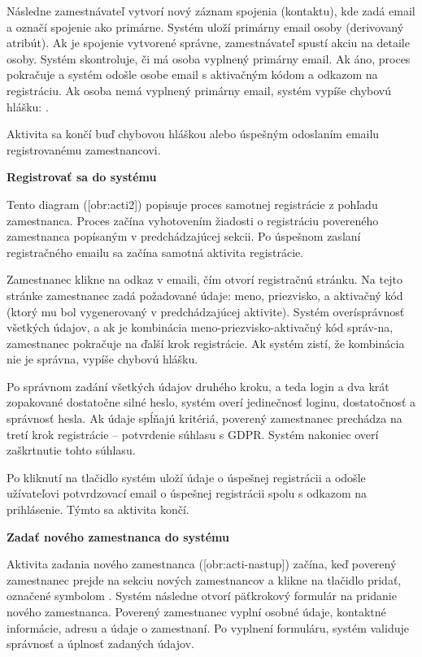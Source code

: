 Následne zamestnávateľ vytvorí nový záznam spojenia (kontaktu), kde zadá email a označí spojenie ako primárne. Systém uloží primárny email osoby (derivovaný atribút). Ak je spojenie vytvorené správne, zamestnávateľ spustí akciu  na detaile osoby. Systém skontroluje, či má osoba vyplnený primárny email. Ak áno, proces pokračuje a systém odošle osobe email s aktivačným kódom a odkazom na registráciu. Ak osoba nemá vyplnený primárny email, systém vypíše chybovú hlášku: .

Aktivita sa končí buď chybovou hláškou alebo úspešným odoslaním emailu registrovanému zamestnancovi.

\blank
\start
\setupindenting[no]
\start\bf Registrovať sa do systému\stop
\stop


Tento diagram ([obr:acti2]) popisuje proces samotnej registrácie z pohľadu zamestnanca. Proces začína vyhotovením žiadosti o registráciu povereného zamestnanca popísaným v predchádzajúcej sekcii. Po úspešnom zaslaní registračného emailu sa začína samotná aktivita registrácie.

Zamestnanec klikne na odkaz v emaili, čím otvorí registračnú stránku. Na tejto stránke zamestnanec zadá požadované údaje: meno, priezvisko, a aktivač\-ný kód (ktorý mu bol vygenerovaný v predchádzajúcej aktivite). Systém overí\zlom správnosť všetkých údajov, a ak je kombinácia meno-priezvisko-aktivačný kód správ-na, zamestnanec pokračuje na ďalší krok registrácie. Ak systém zistí, že kombinácia nie je správna, vypíše chybovú hlášku.

Po správnom zadání všetkých údajov druhého kroku, a teda login a dva krát zopakované dostatočne silné heslo, systém overí jedinečnosť loginu, dostatočnosť a správnosť hesla. Ak údaje spĺňajú kritériá, poverený zamestnanec prechádza na tretí krok registrácie -- potvrdenie súhlasu s GDPR. Systém nakoniec overí zaškrtnutie tohto súhlasu.

Po kliknutí na tlačidlo  systém uloží údaje o úspešnej registrácii a odošle užívateľovi potvrdzovací email o úspešnej registrácii spolu s odkazom na prihlásenie. Týmto sa aktivita končí.

\blank
\start
\setupindenting[no]
\start\bf Zadať nového zamestnanca do systému\stop
\stop

Aktivita zadania nového zamestnanca ([obr:acti-nastup]) začína, keď poverený zamestnanec prejde na sekciu nových zamestnancov a klikne na tlačidlo pridať, označené symbolom \uv{+}. Systém následne otvorí päťkrokový formulár na pridanie nového zamestnanca. Poverený zamestnanec vyplní osobné údaje, kontaktné informácie, adresu a údaje o zamestnaní. Po vyplnení formuláru, systém validuje správnosť a úplnosť zadaných údajov.

